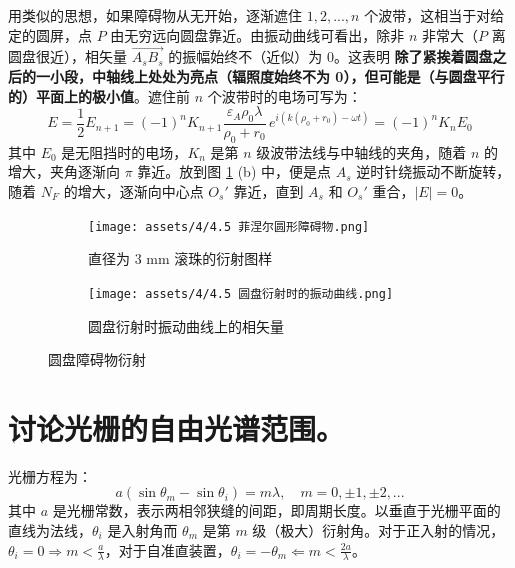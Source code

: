 \documentclass[UTF8]{report}
\theoremstyle{MyLineTheoremStyle} %
\theoremstyle{MyBlockTheoremStyle} %
\theoremstyle{MySubsubsectionStyle} %
\begin{document}
用类似的思想，如果障碍物从无开始，逐渐遮住 $1, 2, ..., n$ 个波带，这相当于对给定的圆屏，点 $P$ 由无穷远向圆盘靠近。由振动曲线可看出，除非 $n$ 非常大（$P$ 离圆盘很近），相矢量 $\overrightarrow{A_sB_s}$ 的振幅始终不（近似）为 0。这表明 {\bfseries 除了紧挨着圆盘之后的一小段，中轴线上处处为亮点（辐照度始终不为 0），但可能是（与圆盘平行的）平面上的极小值}。遮住前 $n$ 个波带时的电场可写为：
\begin{equation}
E = \frac{1}{2} E_{n+1} = (-1)^{n} K_{n+1} \frac{\varepsilon_A \rho_0 \lambda}{\rho_0 + r_0} \,e^{i\left(k(\rho_0 + r_0) - \omega t\right)} = (-1)^{n} K_n E_0
\end{equation}
其中 $E_0$ 是无阻挡时的电场，$K_n$ 是第 $n$ 级波带法线与中轴线的夹角，随着 $n$ 的增大，夹角逐渐向 $\pi$ 靠近。放到图 \ref{圆盘障碍物衍射} (b) 中，便是点 $A_s$ 逆时针绕振动不断旋转，随着 $N_F$ 的增大，逐渐向中心点 $O_s'$ 靠近，直到 $A_s$ 和 $O_s'$ 重合，$| E | = 0 $。

\begin{figure}[H]\centering
\begin{subfigure}[b]{0.5\columnwidth}\centering
    \texttt{[image: assets/4/4.5 菲涅尔圆形障碍物.png]}
    \caption{直径为 3 mm 滚珠的衍射图样}
\end{subfigure}\hfill
\begin{subfigure}[b]{0.5\columnwidth}\centering
    \texttt{[image: assets/4/4.5 圆盘衍射时的振动曲线.png]}
    \caption{圆盘衍射时振动曲线上的相矢量}
\end{subfigure}
\caption{圆盘障碍物衍射}
\label{圆盘障碍物衍射}
\end{figure}



\section{讨论光栅的自由光谱范围。}
光栅方程为：
\begin{equation}
a \left(\sin \theta_m  - \sin \theta_i \right) = m \lambda,\quad m = 0, \pm1, \pm2, ...
\end{equation}
其中 $a$ 是光栅常数，表示两相邻狭缝的间距，即周期长度。以垂直于光栅平面的直线为法线，$\theta_i$ 是入射角而 $\theta_m$ 是第 $m$ 级（极大）衍射角。对于正入射的情况，$\theta_i = 0 \Longrightarrow m < \frac{a}{\lambda}$，对于自准直装置，$\theta_i = -\theta_m \Longleftarrow m < \frac{2a}{\lambda}$。
\end{document}
